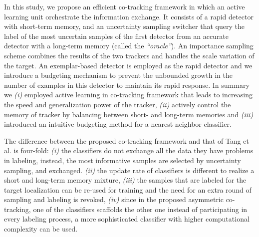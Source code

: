 \documentclass[conference,twoside]{IEEEtran}
\begin{document}
In this study, we propose an efficient co-tracking framework in which an active learning unit orchestrate the information exchange. It consists of a rapid detector with short-term memory, and an uncertainty sampling switcher that query the label of the most uncertain samples of the first detector from an accurate detector with a long-term memory (called the \textit{``oracle''}). An importance sampling scheme combines the results of the two trackers and handles the scale variation of the target. An exemplar-based detector is employed as the rapid detector and we introduce a budgeting mechanism to prevent the unbounded growth in the number of examples in this detector to maintain its rapid response. In summary we \textit{(i)} employed active learning in co-tracking framework that leads to increasing the speed and generalization power of the tracker, \textit{(ii)} actively control the memory of tracker by balancing between short- and long-term memories and \textit{(iii)} introduced an intuitive budgeting method for a nearest neighbor classifier. 

The difference between the proposed co-tracking framework and that of Tang et al. \cite{tang2007co} is four-fold: \textit{(i)} the classifiers do not exchange all the data they have problems in labeling, instead, the most informative samples are selected by uncertainty sampling, and exchanged. \textit{(ii)} the update rate of classifiers is different to realize a short and long-term memory mixture, \textit{(iii)} the samples that are labeled for the target localization can be re-used for training and the need for an extra round of sampling and labeling is revoked, \textit{(iv)} since in the proposed asymmetric co-tracking, one of the classifiers scaffolds the other one instead of participating in every labeling process, a more sophisticated classifier with higher computational complexity can be used.
\end{document}
